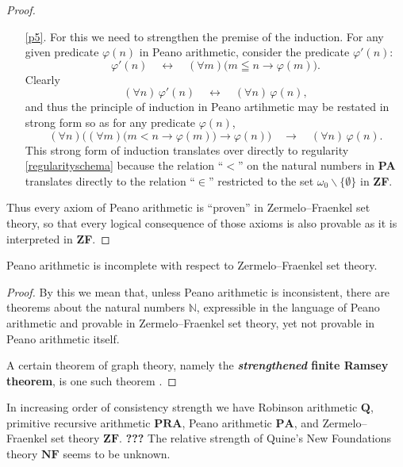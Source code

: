 \documentclass[letterpaper]{article}
\begin{document}
\begin{proof}
\begin{enumerate}
		\item [\LooseBearing\ref{p5}.]  For this we need to strengthen the premise of the induction.  For any given predicate $\varphi(n)$ in Peano arithmetic, consider the predicate $\varphi'(n)$:
		\begin{equation}
		\varphi'(n)\quad\longleftrightarrow\quad(\forall m)\big(m\leqq n\longrightarrow\varphi(m)\big).
		\end{equation}
		Clearly
		\begin{equation}
		(\forall n)\,\varphi'(n)\quad\longleftrightarrow\quad(\forall n)\,\varphi(n),
		\end{equation}
		and thus the principle of induction in Peano artihmetic may be restated in strong form so as for any predicate $\varphi(n)$, 
		\begin{equation}
			(\forall n)\Big((\forall m)\big(m< n\longrightarrow\varphi(m)\big)\longrightarrow\varphi(n)\Big)\quad\longrightarrow\quad(\forall n)\,\varphi(n).
		\end{equation}
		This strong form of induction translates over directly to regularity \ref{regularityschema} because the relation ``$<$'' on the natural numbers in \textbf{PA} translates directly to the relation ``$\in$'' restricted to the set $\omega_0\operatorname{\backslash}\{\emptyset\}$ in \textbf{ZF}.
	\end{enumerate}
	Thus every axiom of Peano arithmetic is ``proven'' in Zermelo--Fraenkel set theory, so that every logical consequence of those axioms is also provable as it is interpreted in \textbf{ZF}.
\end{proof}
\begin{theorem}
	Peano arithmetic is incomplete with respect to Zermelo--Fraenkel set theory.
\end{theorem}
\begin{proof}
	By this we mean that, unless Peano arithmetic is inconsistent, there are theorems about the natural numbers $\mathbb N$, expressible in the language of Peano arithmetic and provable in Zermelo--Fraenkel set theory, yet not provable in Peano arithmetic itself.
	
	A certain theorem of graph theory, namely the \textbf{\textit{strengthened} finite Ramsey theorem}, is one such theorem \cite{twer1981,ph1,paris1978}.
\end{proof}
\begin{remark}
In increasing order of consistency strength we have Robinson arithmetic $\mathbf Q$, primitive recursive arithmetic $\mathbf{PRA}$, Peano arithmetic $\mathbf{PA}$,  and Zermelo--Fraenkel set theory $\mathbf{ZF}$.  {\color{red}\textbf{???}} The relative strength of Quine's New Foundations theory $\mathbf{NF}$ seems to be unknown.
\end{remark}
\end{document}
